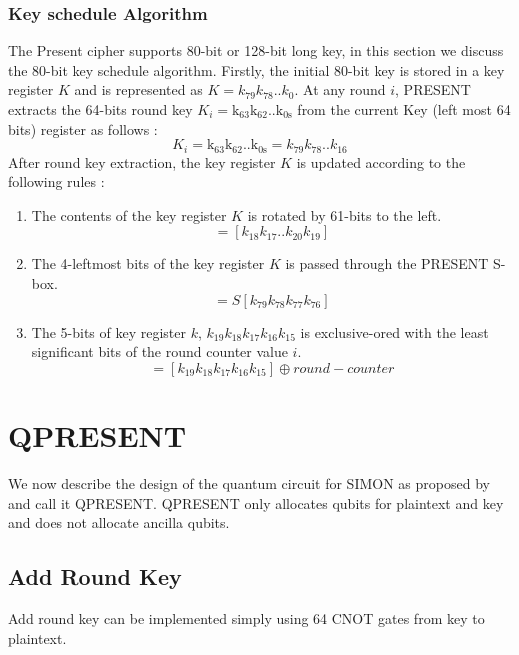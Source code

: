 \documentclass[preprint]{transcrypto}
\begin{document}
\subsubsection{Key schedule Algorithm}\label{sec:qpksa}
The Present cipher supports 80-bit or 128-bit long key, in this section we discuss the 80-bit key schedule algorithm. Firstly, the initial 80-bit key is stored in a key register $K$ and is represented as $K = k_{79}k_{78}$..$k_0$. At any round $i$, PRESENT extracts the 64-bits round key $K_i = \mathrm{k_{63}}\mathrm{k_{62}}$..$\mathrm{k_{0s}}$ from the current Key (left most 64 bits) register as follows : 
\begin{equation*}
    K_i = \mathrm{k_{63}}\mathrm{k_{62}}..\mathrm{k_{0s}} = k_{79}k_{78}..k_{16}
\end{equation*}
After round key extraction, the key register $K$ is updated according to the following rules : 
\begin{enumerate}
    \item The contents of the key register $K$ is rotated by 61-bits to the left.
    \begin{equation*}
        [k_{79}k_{78}..k_{0}] = [k_{18}k_{17}..k_{20}k_{19}]
    \end{equation*}
    \item The 4-leftmost bits of the key register $K$ is passed through the PRESENT S-box.
    \begin{equation*}
        [k_{79}k_{78}k_{77}k_{76}] = S[k_{79}k_{78}k_{77}k_{76}]
    \end{equation*}
    \item The 5-bits of key register $k$, $k_{19}k_{18}k_{17}k_{16}k_{15}$ is exclusive-ored with the least significant bits of the round counter value $i$. 
    \begin{equation*}
        [k_{19}k_{18}k_{17}k_{16}k_{15}] = [k_{19}k_{18}k_{17}k_{16}k_{15}] \oplus round-counter
    \end{equation*}
\end{enumerate}

\section{QPRESENT}\label{sec:qpresent}
We now describe the design of the quantum circuit for SIMON as proposed by \cite{gop} and call it QPRESENT. QPRESENT only allocates qubits for plaintext and key and does not allocate ancilla qubits. 

\subsection{Add Round Key}
Add round key can be implemented simply using 64 CNOT gates from key to plaintext.
\end{document}

